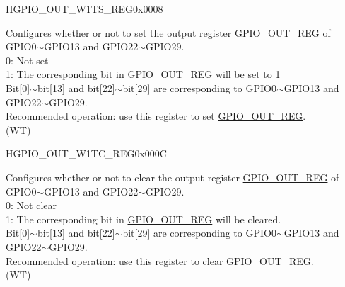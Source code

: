 \begin{register}{H}{GPIO\_OUT\_W1TS\_REG}{0x0008}\label{regdesc:GPIOOUTW1TSREG}
%
\regnewline%
\begin{regdesc}\begin{reglist}
\label{fielddesc:GPIOOUTW1TS}\item [GPIO\_OUT\_W1TS] Configures whether or not to set the output register \hyperref[regdesc:GPIOOUTREG]{GPIO\_OUT\_REG} of GPIO0$\sim$GPIO13 and GPIO22$\sim$GPIO29.\\
0: Not set\\
1: The corresponding bit in \hyperref[regdesc:GPIOOUTREG]{GPIO\_OUT\_REG} will be set to 1\\
Bit[0]$\sim$bit[13] and bit[22]$\sim$bit[29] are corresponding to GPIO0$\sim$GPIO13 and GPIO22$\sim$GPIO29. \\
Recommended operation: use this register to set \hyperref[regdesc:GPIOOUTREG]{GPIO\_OUT\_REG}. \\ (WT)
\end{reglist}\end{regdesc}
\end{register}


\begin{register}{H}{GPIO\_OUT\_W1TC\_REG}{0x000C}\label{regdesc:GPIOOUTW1TCREG}
%
\regnewline%
\begin{regdesc}\begin{reglist}
\label{fielddesc:GPIOOUTW1TC}\item [GPIO\_OUT\_W1TC] Configures whether or not to clear the output register \hyperref[regdesc:GPIOOUTREG]{GPIO\_OUT\_REG} of GPIO0$\sim$GPIO13 and GPIO22$\sim$GPIO29.\\
0: Not clear\\
1: The corresponding bit in \hyperref[regdesc:GPIOOUTREG]{GPIO\_OUT\_REG} will be cleared.\\
Bit[0]$\sim$bit[13] and bit[22]$\sim$bit[29] are corresponding to GPIO0$\sim$GPIO13 and GPIO22$\sim$GPIO29. \\
Recommended operation: use this register to clear \hyperref[regdesc:GPIOOUTREG]{GPIO\_OUT\_REG}. \\ (WT)
\end{reglist}\end{regdesc}
\end{register}


